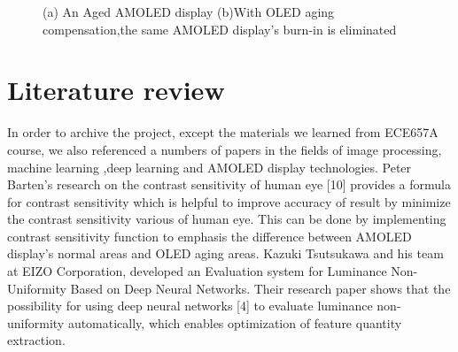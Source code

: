 \documentclass[runningheads]{llncs}
\begin{document}
\begin{figure}
    \centering
    \caption{ (a) An Aged AMOLED display (b)With OLED aging compensation,the same AMOLED display's burn-in is eliminated }        
    \label{fig:1}
\end{figure}

\section{Literature review}
In order to archive the project, except the materials we learned from ECE657A course, we also referenced a numbers of papers in the fields of image processing, machine learning ,deep learning and AMOLED display technologies. 
Peter Barten’s research on the contrast sensitivity of human eye [10] provides a formula for contrast sensitivity which is helpful to improve accuracy of result by minimize the contrast sensitivity various of human eye. This can be done by implementing contrast sensitivity function to emphasis the difference between AMOLED display's normal areas and OLED aging areas.
Kazuki Tsutsukawa and his team at EIZO Corporation, developed an Evaluation system for Luminance Non-Uniformity Based on Deep Neural Networks. Their research paper shows that the possibility for using deep neural networks [4] to evaluate luminance non-uniformity automatically, which enables optimization of feature quantity extraction.
\end{document}
